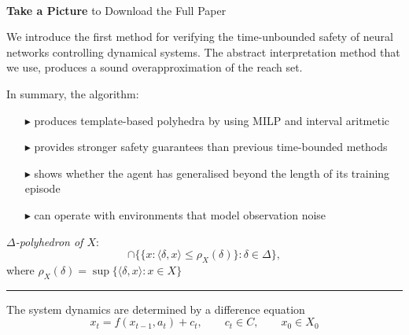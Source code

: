 \documentclass[a0paper,fleqn]{betterposter}
\newcommand\inner[2]{\langle #1,#2 \rangle}
\begin{document}
{{\begin{center}
\\ \textbf{Take a Picture} to Download the Full Paper
\end{center}

}

}{
\vspace{-5mm}
\begin{tcolorbox}[breakable,colback=white,colframe=oxfordblue,width=\dimexpr\textwidth+12mm\relax,enlarge left by=-6mm,boxrule=3mm,title=\textbf{Introduction},titlerule=5mm,arc=3mm,toptitle=5mm,bottomtitle=5mm,boxsep=5mm]
We introduce the first method for verifying the time-unbounded safety of neural networks controlling dynamical systems. The abstract interpretation method that we use, produces a sound overapproximation of the reach set.

In summary, the algorithm:
\begin{itemize}
\item[\textcolor{oxfordblue}{$\blacktriangleright$}] produces template-based polyhedra by using MILP and interval aritmetic
\item[\textcolor{oxfordblue}{$\blacktriangleright$}] provides stronger safety guarantees than previous time-bounded methods
\item[\textcolor{oxfordblue}{$\blacktriangleright$}] shows whether the agent has generalised beyond the length of its training episode
\item[\textcolor{oxfordblue}{$\blacktriangleright$}] can operate with environments that model observation noise
\end{itemize}
\end{tcolorbox}

\vspace{15mm}
\begin{tcolorbox}[breakable,colback=white,colframe=oxfordblue,width=\dimexpr\textwidth+12mm\relax,enlarge left by=-6mm,boxrule=3mm,title=\textbf{Background},titlerule=5mm,arc=3mm,toptitle=5mm,bottomtitle=5mm,boxsep=5mm]
{\em $\Delta$-polyhedron of $X$}:
\begin{equation}
  \cap \{ \{ x \colon \inner{\delta}{x} \leq \rho_X(\delta)\} \colon \delta \in \Delta \},\label{eq:tpoly}
\end{equation}
where $\rho_X(\delta) = \sup\{ \inner{\delta}{x} \colon x \in X\}$\\
\vspace{7mm}
\textcolor{oxfordblue}{\rule{\textwidth}{3mm}}
The system dynamics are determined by a difference equation 
$$  x_{t} = f(x_{t-1}, a_t) + c_t,\qquad c_t \in C, \qquad x_0 \in X_0$$


\end{tcolorbox}}
\end{document}
